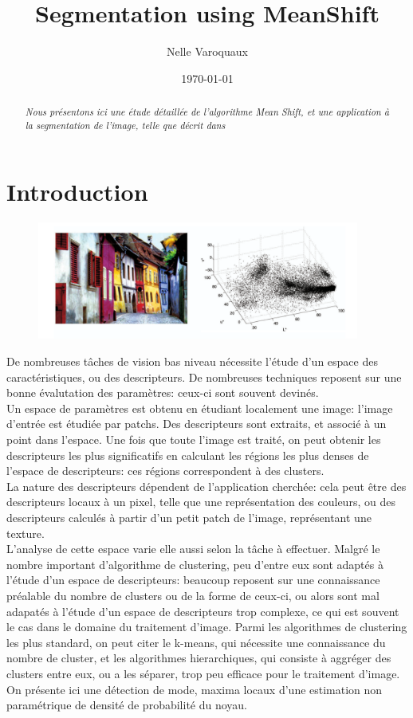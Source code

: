 \documentclass{article}
\date{\today}
\title{Segmentation using MeanShift}
\author{Nelle Varoquaux}
\begin{document}
\maketitle

\begin{abstract}
\textit{Nous présentons ici une étude détaillée de l'algorithme Mean Shift, et
une application à la segmentation de l'image, telle que décrit dans
\cite{my_article}}
\end{abstract}

\section{Introduction}

\begin{figure}
\includegraphics[width=400px]{images/color_space.png}
\end{figure}

De nombreuses tâches de vision bas niveau nécessite l'étude d'un espace des
caractéristiques, ou des descripteurs. De nombreuses techniques reposent sur
une bonne évalutation des paramètres: ceux-ci sont souvent devinés. \\
Un espace de paramètres est obtenu en étudiant localement une image: l'image
d'entrée est étudiée par patchs. Des descripteurs sont extraits, et associé à
un point dans l'espace. Une fois que toute l'image est traité, on peut obtenir
les descripteurs les plus significatifs en calculant les régions les plus
denses de l'espace de descripteurs: ces régions correspondent à des clusters.
\\
La nature des descripteurs dépendent de l'application cherchée: cela peut
être des descripteurs locaux à un pixel, telle que une représentation des
couleurs, ou des descripteurs calculés à partir d'un petit patch de l'image,
représentant une texture. \\
L'analyse de cette espace varie elle aussi selon la tâche à effectuer. Malgré
le nombre important d'algorithme de clustering, peu d'entre eux sont adaptés à
l'étude d'un espace de descripteurs: beaucoup reposent sur une
connaissance préalable du nombre de clusters ou de la forme de ceux-ci, ou
alors sont mal adapatés à l'étude d'un espace de descripteurs trop complexe,
ce qui est souvent le cas dans le domaine du traitement d'image. Parmi les
algorithmes de clustering les plus standard, on peut citer le k-means, qui
nécessite une connaissance du nombre de cluster, et les algorithmes
hierarchiques, qui consiste à aggréger des clusters entre eux, ou a les
séparer, trop peu efficace pour le traitement d'image. \\
On présente ici une détection de mode, maxima locaux d'une estimation non
paramétrique de densité de probabilité du noyau.
\end{document}
